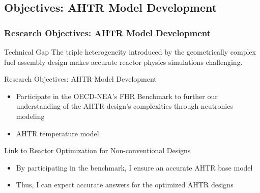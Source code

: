 \subsection{Objectives: AHTR Model Development}
    \begin{frame}
        \frametitle{Research Objectives: AHTR Model Development}
        \begin{block}{Technical Gap}
            The triple heterogeneity introduced by the geometrically complex 
            fuel assembly design makes accurate reactor physics simulations challenging. 
        \end{block}
        \begin{block}{Research Objectives: AHTR Model Development}
        \begin{itemize}
            \item Participate in the OECD-NEA's FHR Benchmark to further our understanding of 
            the AHTR design's complexities through neutronics modeling
            \item AHTR temperature model
        \end{itemize}
        \end{block}
        \begin{block}{Link to Reactor Optimization for Non-conventional Designs}
        \begin{itemize}
        \item By participating in the benchmark, I ensure an accurate AHTR base model
        \item Thus, I can expect accurate answers for the optimized AHTR designs
        \end{itemize}
        \end{block}
    \end{frame}

